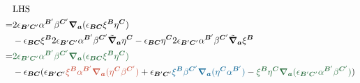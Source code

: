 \begin{equation*}
	\begin{aligned}
		& \mathrm{LHS}\\
		= & 2\epsilon _{\boldsymbol{B} '\boldsymbol{C} '} \alpha ^{\boldsymbol{B} '} \beta ^{\boldsymbol{C} '}\boldsymbol{\nabla }_{\boldsymbol{a}} (\epsilon _{\boldsymbol{BC}} \xi ^{\boldsymbol{B}} \eta ^{\boldsymbol{C}} )\\
		& -\epsilon _{\boldsymbol{BC}} \xi ^{\boldsymbol{B}} 2\epsilon _{\boldsymbol{B} '\boldsymbol{C} '} \alpha ^{\boldsymbol{B} '} \beta ^{\boldsymbol{C} '}\tilde{\boldsymbol{\nabla }}_{\boldsymbol{a}} \eta ^{\boldsymbol{C}} -\epsilon _{\boldsymbol{BC}} \eta ^{\boldsymbol{C}} 2\epsilon _{\boldsymbol{B} '\boldsymbol{C} '} \alpha ^{\boldsymbol{B} '} \beta ^{\boldsymbol{C} '}\tilde{\boldsymbol{\nabla }}_{\boldsymbol{a}} \xi ^{\boldsymbol{B}}\\
		= & \textcolor{guanlv}{2\epsilon }\textcolor{guanlv}{_{\boldsymbol{B} '\boldsymbol{C} '}}\textcolor{guanlv}{\alpha }\textcolor{guanlv}{^{\boldsymbol{B} '}}\textcolor{guanlv}{\beta }\textcolor{guanlv}{^{\boldsymbol{C} '}}\boldsymbol{\textcolor{guanlv}{\nabla }}\textcolor{guanlv}{_{\boldsymbol{a}}}\textcolor{guanlv}{(\epsilon }\textcolor{guanlv}{_{\boldsymbol{BC}}}\textcolor{guanlv}{\xi }\textcolor{guanlv}{^{\boldsymbol{B}}}\textcolor{guanlv}{\eta }\textcolor{guanlv}{^{\boldsymbol{C}}}\textcolor{guanlv}{)}\\
		& -\epsilon _{\boldsymbol{BC}} (\epsilon _{\boldsymbol{B} '\boldsymbol{C} '}\textcolor{mulan}{\xi }\textcolor{mulan}{^{\boldsymbol{B}}}\textcolor{mulan}{\alpha }\textcolor{mulan}{^{\boldsymbol{B} '}}\boldsymbol{\textcolor{mulan}{\nabla }}\textcolor{mulan}{_{\boldsymbol{a}}}\textcolor{mulan}{(\eta }\textcolor{mulan}{^{\boldsymbol{C}}}\textcolor{mulan}{\beta }\textcolor{mulan}{^{\boldsymbol{C} '}}\textcolor{mulan}{)} +\epsilon _{\boldsymbol{B} '\boldsymbol{C} '}\textcolor{roulan}{\xi }\textcolor{roulan}{^{\boldsymbol{B}}}\textcolor{roulan}{\beta }\textcolor{roulan}{^{\boldsymbol{C} '}}\boldsymbol{\textcolor{roulan}{\nabla }}\textcolor{roulan}{_{\boldsymbol{a}}}\textcolor{roulan}{(\eta }\textcolor{roulan}{^{\boldsymbol{C}}}\textcolor{roulan}{\alpha }\textcolor{roulan}{^{\boldsymbol{B} '}}\textcolor{roulan}{)} -\textcolor{guanlv}{\xi }\textcolor{guanlv}{^{\boldsymbol{B}}}\textcolor{guanlv}{\eta }\textcolor{guanlv}{^{\boldsymbol{C}}}\boldsymbol{\textcolor{guanlv}{\nabla }}\textcolor{guanlv}{_{\boldsymbol{a}}}\textcolor{guanlv}{(\epsilon }\textcolor{guanlv}{_{\boldsymbol{B} '\boldsymbol{C} '}}\textcolor{guanlv}{\alpha }\textcolor{guanlv}{^{\boldsymbol{B} '}}\textcolor{guanlv}{\beta }\textcolor{guanlv}{^{\boldsymbol{C} '}}\textcolor{guanlv}{)} )\\

\end{aligned}
\end{equation*}
